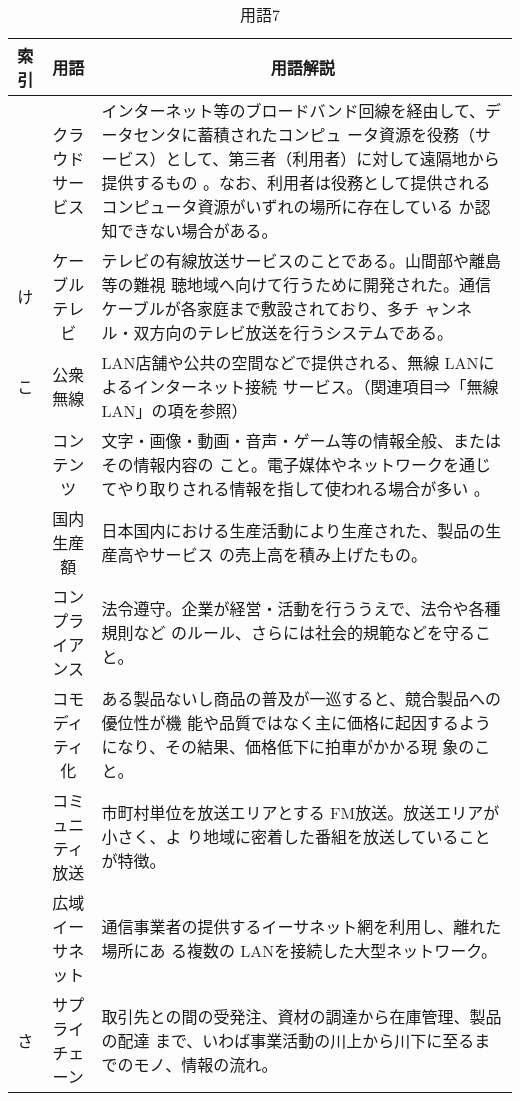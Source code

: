 \begin{table}[htb]
  \begin{center}
    \caption{用語7}
    \begin{tabular}{|c|c|p{10cm}|}
      \hline
      索引 & 用語 & \multicolumn{1}{c|}{用語解説} \\
      \hline
      & クラウドサービス & 
      インターネット等のブロードバンド回線を経由して、データセンタに蓄積されたコンピュ
      ータ資源を役務（サービス）として、第三者（利用者）に対して遠隔地から提供するもの
      。なお、利用者は役務として提供されるコンピュータ資源がいずれの場所に存在している
      か認知できない場合がある。\\
      \hline
      け & ケーブルテレビ & テレビの有線放送サービスのことである。山間部や離島等の難視
      聴地域へ向けて行うために開発された。通信ケーブルが各家庭まで敷設されており、多チ
      ャンネル・双方向のテレビ放送を行うシステムである。 \\
      \hline
      こ & 
      公衆無線 & LAN店舗や公共の空間などで提供される、無線 LANによるインターネット接続
      サービス。（関連項目⇒「無線LAN」の項を参照）\\
      \cline{2-3}
      & コンテンツ & 文字・画像・動画・音声・ゲーム等の情報全般、またはその情報内容の
      こと。電子媒体やネットワークを通じてやり取りされる情報を指して使われる場合が多い
      。 \\
      \cline{2-3}
      & 国内生産額 & 日本国内における生産活動により生産された、製品の生産高やサービス
      の売上高を積み上げたもの。 \\
      \cline{2-3}
      & コンプライアンス & 法令遵守。企業が経営・活動を行ううえで、法令や各種規則など
      のルール、さらには社会的規範などを守ること。 \\
      \cline{2-3}
      & コモディティ化 & ある製品ないし商品の普及が一巡すると、競合製品への優位性が機
      能や品質ではなく主に価格に起因するようになり、その結果、価格低下に拍車がかかる現
      象のこと。 \\
      \cline{2-3}
      & コミュニティ放送 & 市町村単位を放送エリアとする FM放送。放送エリアが小さく、よ
      り地域に密着した番組を放送していることが特徴。 \\
      \cline{2-3}
      & 広域イーサネット & 通信事業者の提供するイーサネット網を利用し、離れた場所にあ
      る複数の LANを接続した大型ネットワーク。 \\
      \hline
      さ & サプライチェーン & 取引先との間の受発注、資材の調達から在庫管理、製品の配達
      まで、いわば事業活動の川上から川下に至るまでのモノ、情報の流れ。 \\

\end{tabular}
\end{center}
\end{table}
